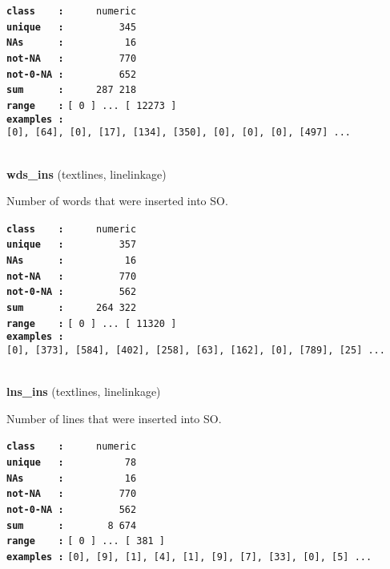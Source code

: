\documentclass[]{article}
\begin{document}
\textbf{\texttt{class\ \ \ \ :}} \texttt{~~~~~numeric}\\
\textbf{\texttt{unique\ \ \ :}} \texttt{~~~~~~~~~345}\\
\textbf{\texttt{NAs\ \ \ \ \ \ :}} \texttt{~~~~~~~~~~16}\\
\textbf{\texttt{not-NA\ \ \ :}} \texttt{~~~~~~~~~770}\\
\textbf{\texttt{not-0-NA\ :}} \texttt{~~~~~~~~~652}\\
\textbf{\texttt{sum\ \ \ \ \ \ :}} \texttt{~~~~~287~218}\\
\textbf{\texttt{range\ \ \ \ :}}
\texttt{{[}\ 0\ {]}\ ...\ {[}\ 12273\ {]}}\\
\textbf{\texttt{examples\ :}}
\texttt{{[}0{]},\ {[}64{]},\ {[}0{]},\ {[}17{]},\ {[}134{]},\ {[}350{]},\ {[}0{]},\ {[}0{]},\ {[}0{]},\ {[}497{]}\ ...}\\

~

\textbf{wds\_ins} (textlines, linelinkage)

Number of words that were inserted into SO.

\textbf{\texttt{class\ \ \ \ :}} \texttt{~~~~~numeric}\\
\textbf{\texttt{unique\ \ \ :}} \texttt{~~~~~~~~~357}\\
\textbf{\texttt{NAs\ \ \ \ \ \ :}} \texttt{~~~~~~~~~~16}\\
\textbf{\texttt{not-NA\ \ \ :}} \texttt{~~~~~~~~~770}\\
\textbf{\texttt{not-0-NA\ :}} \texttt{~~~~~~~~~562}\\
\textbf{\texttt{sum\ \ \ \ \ \ :}} \texttt{~~~~~264~322}\\
\textbf{\texttt{range\ \ \ \ :}}
\texttt{{[}\ 0\ {]}\ ...\ {[}\ 11320\ {]}}\\
\textbf{\texttt{examples\ :}}
\texttt{{[}0{]},\ {[}373{]},\ {[}584{]},\ {[}402{]},\ {[}258{]},\ {[}63{]},\ {[}162{]},\ {[}0{]},\ {[}789{]},\ {[}25{]}\ ...}\\

~

\textbf{lns\_ins} (textlines, linelinkage)

Number of lines that were inserted into SO.

\textbf{\texttt{class\ \ \ \ :}} \texttt{~~~~~numeric}\\
\textbf{\texttt{unique\ \ \ :}} \texttt{~~~~~~~~~~78}\\
\textbf{\texttt{NAs\ \ \ \ \ \ :}} \texttt{~~~~~~~~~~16}\\
\textbf{\texttt{not-NA\ \ \ :}} \texttt{~~~~~~~~~770}\\
\textbf{\texttt{not-0-NA\ :}} \texttt{~~~~~~~~~562}\\
\textbf{\texttt{sum\ \ \ \ \ \ :}} \texttt{~~~~~~~8~674}\\
\textbf{\texttt{range\ \ \ \ :}}
\texttt{{[}\ 0\ {]}\ ...\ {[}\ 381\ {]}}\\
\textbf{\texttt{examples\ :}}
\texttt{{[}0{]},\ {[}9{]},\ {[}1{]},\ {[}4{]},\ {[}1{]},\ {[}9{]},\ {[}7{]},\ {[}33{]},\ {[}0{]},\ {[}5{]}\ ...}\\
\end{document}
